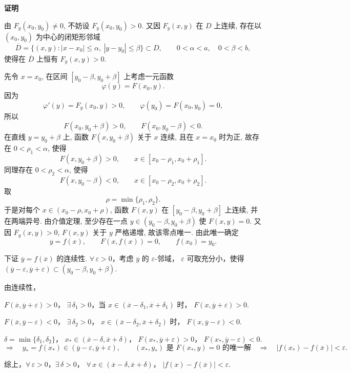 \textbf{证明}

由 $F_y(x_0,y_0)\ne0$, 不妨设
	$F_y(x_0,y_0)>0$. 又因 $F_y(x,y)$ 在 $D$ 上连续,
	存在以 $(x_0,y_0)$ 为中心的闭矩形邻域
	\[
	\overline D=
	\{(x,y):|x-x_0|\le\alpha,\ |y-y_0|\le\beta\}
	\subset D,
	\qquad
	0<\alpha<a,\quad 0<\beta<b,
	\]
	使得在 $\overline D$ 上恒有 $F_y(x,y)>0$.

	先令 $x=x_0$, 在区间
	$[y_0-\beta,y_0+\beta]$ 上考虑一元函数
	\[
	\varphi(y)=F(x_0,y).
	\]
	因为
	\[
	\varphi'(y)=F_y(x_0,y)>0,
	\qquad
	\varphi(y_0)=F(x_0,y_0)=0,
	\]
	所以
	\[
	F(x_0,y_0+\beta)>0,
	\qquad
	F(x_0,y_0-\beta)<0.
	\]
	在直线 $y=y_0+\beta$ 上, 函数
	$F(x,y_0+\beta)$ 关于 $x$ 连续, 且在 $x=x_0$ 时为正,
	故存在 $0<\rho_1<\alpha$, 使得
	\[
	F(x,y_0+\beta)>0,
	\qquad
	x\in[x_0-\rho_1,x_0+\rho_1].
	\]
	同理存在 $0<\rho_2<\alpha$, 使得
	\[
	F(x,y_0-\beta)<0,
	\qquad
	x\in[x_0-\rho_2,x_0+\rho_2].
	\]
	取
	\[
	\rho=\min\{\rho_1,\rho_2\}.
	\]
	于是对每个 $x\in(x_0-\rho,x_0+\rho)$,
	函数 $F(x,y)$ 在 $[y_0-\beta,y_0+\beta]$ 上连续,
	并在两端异号. 由介值定理, 至少存在一点
	$y\in(y_0-\beta,y_0+\beta)$ 使 $F(x,y)=0$.
	又因 $F_y(x,y)>0$, $F(x,y)$ 关于 $y$ 严格递增,
	故该零点唯一. 由此唯一确定
	\[
	y=f(x),
	\qquad
	F(x,f(x))=0,
	\qquad
	f(x_0)=y_0.
	\]

	
	下证 $\overline y=f(\overline x)$ 的连续性.
	$\forall\,\varepsilon>0$，考虑 $\overline y$ 的 $\varepsilon$-邻域，
	$\varepsilon$ 可取充分小，使得
	$(\overline y-\varepsilon,\overline y+\varepsilon)\subset(y_0-\beta,y_0+\beta)$.
	
	由连续性，
	
	$F(\overline x,\overline y+\varepsilon)>0$，
	$\exists\,\delta_1>0$，当
	$x\in(\overline x-\delta_1,\overline x+\delta_1)$ 时，
	$F(x,\overline y+\varepsilon)>0$.
	
	$F(\overline x,\overline y-\varepsilon)<0$，
	$\exists\,\delta_2>0$，
	$x\in(\overline x-\delta_2,\overline x+\delta_2)$ 时，
	$F(x,\overline y-\varepsilon)<0$.
	
	$\delta=\min\{\delta_1,\delta_2\}$，
	$x_*\in(\overline x-\delta,\overline x+\delta)$，
	$F(x_*,\overline y+\varepsilon)>0$，
	$F(x_*,\overline y-\varepsilon)<0$.
	\[
	\Rightarrow\quad
	y_*=f(x_*)\in(\overline y-\varepsilon,\overline y+\varepsilon),
	\qquad
	(x_*,y_*)\text{ 是 }F(x_*,y)=0\text{ 的唯一解}
	\quad\Rightarrow\quad
	|f(x_*)-f(\overline x)|<\varepsilon.
	\]
	
	综上，$\forall\,\varepsilon>0$，$\exists\,\delta>0$，
	$\forall\,x\in(\overline x-\delta,\overline x+\delta)$，
	$|f(x)-f(\overline x)|<\varepsilon$.

